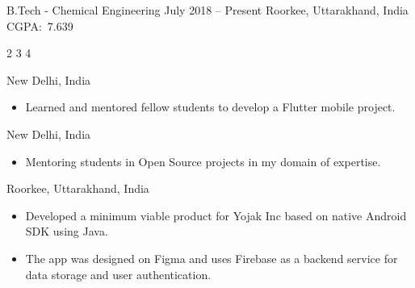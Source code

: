 \documentclass[10pt,a4paper,ragged2e]{altacv}
\begin{document}

\begin{fullwidth}
\makecvheader
\end{fullwidth}



 {B.Tech - Chemical Engineering } {July 2018 -- Present} {Roorkee, Uttarakhand, India} 
\hbox {CGPA: 7.639}


 {2}
 {3}
 {4}




     {New Delhi, India}
\begin{itemize}
\item Learned and mentored fellow students to develop a Flutter mobile project.
\end{itemize}
\divider




     {New Delhi, India}
\begin{itemize}
\item Mentoring students in Open Source projects in my domain of expertise.
\end{itemize}
\divider




     {Roorkee, Uttarakhand, India}
\begin{itemize}
\item{ Developed a minimum viable product for Yojak Inc based on native Android SDK using Java.}
\item{ The app was designed on Figma and uses Firebase as a backend service for data storage and user authentication.}
\end{itemize}
\divider
\end{document}
